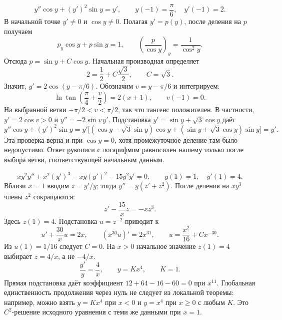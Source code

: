 \[
 y''\cos y+(y')^2\sin y=y',\qquad
 y(-1)=\frac\pi6,\quad y'(-1)=2.
\]
В начальной точке $y'\ne0$ и $\cos y\ne0$.
Полагая $y'=p(y)$, после деления на $p$ получаем
\[
 p_y\cos y+p\sin y=1,\qquad
 \left(\frac p{\cos y}\right)_y=\frac1{\cos^2 y}.
\]
Отсюда $p=\sin y+C\cos y$. Начальная производная определяет
\[
 2=\frac12+C\frac{\sqrt3}2,\qquad C=\sqrt3.
\]
Значит, $y'=2\cos(y-\pi/6)$. Обозначим $v=y-\pi/6$ и интегрируем:
\[
 \ln\tan\left(\frac\pi4+\frac v2\right)=2(x+1),
 \qquad v(-1)=0.
\]
На выбранной ветви $-\pi/2<v<\pi/2$, так что тангенс положителен.
В частности, $y'=2\cos v>0$ и $y''=-2\sin v\,y'$.
Подстановка $y'=\sin y+\sqrt3\cos y$ даёт
\[
 y''\cos y+(y')^2\sin y
 =y'\bigl[(\cos y-\sqrt3\sin y)\cos y
 +(\sin y+\sqrt3\cos y)\sin y\bigr]=y'.
\]
Эта проверка верна и при $\cos y=0$, хотя промежуточное деление там
было недопустимо. Ответ рукописи с логарифмом равносилен нашему
только после выбора ветви, соответствующей начальным данным.

\[
 xy^2y''+x^2(y')^3-xy(y')^2-15y^2y'=0,
 \qquad y(1)=1,\quad y'(1)=4.
\]
Вблизи $x=1$ вводим $z=y'/y$; тогда $y''=y(z'+z^2)$.
После деления на $xy^3$ члены $z^2$ сокращаются:
\[
 z'-\frac{15}x z=-xz^3.
\]
Здесь $z(1)=4$. Подстановка $u=z^{-2}$ приводит к
\[
 u'+\frac{30}x u=2x,\qquad
 (x^{30}u)'=2x^{31},\qquad
 u=\frac{x^2}{16}+Cx^{-30}.
\]
Из $u(1)=1/16$ следует $C=0$. На $x>0$ начальное значение $z(1)=4$
выбирает $z=4/x$, а не $-4/x$.
\[
 \frac{y'}y=\frac4x,\qquad y=Kx^4,\qquad K=1.
\]
Прямая подстановка даёт коэффициент
$12+64-16-60=0$ при $x^{11}$. Глобальная единственность продолжения
через нуль не следует из локальной теоремы: например, можно взять
$y=Kx^4$ при $x<0$ и $y=x^4$ при $x\ge0$ с любым $K$.
Это $C^2$-решение исходного уравнения с теми же данными при $x=1$.
